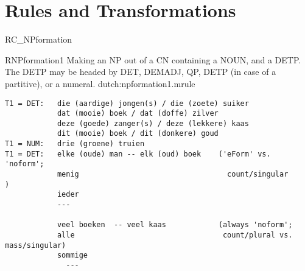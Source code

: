 \section{Rules and Transformations}
\begin{mruleclass}{RC_NPformation}
\begin{classdescr}
\kind \nokind
\classtask \notask
\end{classdescr}

\begin{members}
\begin{member}
 RNPformation1
Making an NP out of a CN containing a NOUN, and a DETP.
The DETP may be headed by DET, DEMADJ, QP, DETP (in case of a partitive),
or a numeral. 
\file dutch:npformation1.mrule
\semantics \nosemantics
\example 
\begin{verbatim}
T1 = DET:   die (aardige) jongen(s) / die (zoete) suiker
            dat (mooie) boek / dat (doffe) zilver
            deze (goede) zanger(s) / deze (lekkere) kaas
            dit (mooie) boek / dit (donkere) goud
T1 = NUM:   drie (groene) truien
T1 = DET:   elke (oude) man -- elk (oud) boek    ('eForm' vs. 'noform';
            menig                                  count/singular       )
            ieder
            ---

            veel boeken  -- veel kaas            (always 'noform';
            alle                                  count/plural vs. mass/singular)
            sommige
              ---


\end{verbatim}
\end{member}
\end{members}
\end{mruleclass}
